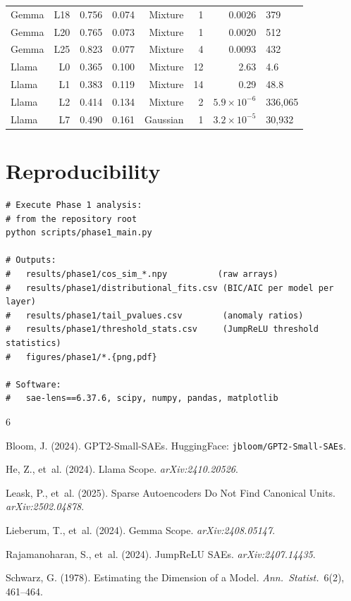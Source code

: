 \documentclass[11pt,a4paper]{article}
\begin{document}
\begin{longtable}{@{}lrrrrrrl@{}}
Gemma & L18 & 0.756 & 0.074 & Mixture & 1 & 0.0026   & 379 \\
Gemma & L20 & 0.765 & 0.073 & Mixture & 1 & 0.0020   & 512 \\
Gemma & L25 & 0.823 & 0.077 & Mixture & 4 & 0.0093   & 432 \\
Llama & L0  & 0.365 & 0.100 & Mixture & 12 & 2.63 & 4.6 \\
Llama & L1  & 0.383 & 0.119 & Mixture & 14 & 0.29 & 48.8 \\
Llama & L2  & 0.414 & 0.134 & Mixture & 2  & $5.9\times10^{-6}$ & 336,065 \\
Llama & L7  & 0.490 & 0.161 & Gaussian & 1 & $3.2\times10^{-5}$ & 30,932 \\
\end{longtable}

\section{Reproducibility}
\label{app:repro}

\begin{verbatim}
# Execute Phase 1 analysis:
# from the repository root
python scripts/phase1_main.py

# Outputs:
#   results/phase1/cos_sim_*.npy          (raw arrays)
#   results/phase1/distributional_fits.csv (BIC/AIC per model per layer)
#   results/phase1/tail_pvalues.csv        (anomaly ratios)
#   results/phase1/threshold_stats.csv     (JumpReLU threshold statistics)
#   figures/phase1/*.{png,pdf}

# Software:
#   sae-lens==6.37.6, scipy, numpy, pandas, matplotlib
\end{verbatim}

\newpage

\begin{thebibliography}{6}

Bloom, J. (2024). GPT2-Small-SAEs. HuggingFace: \texttt{jbloom/GPT2-Small-SAEs}.

He, Z., et~al. (2024). Llama Scope. \emph{arXiv:2410.20526}.

Leask, P., et~al. (2025). Sparse Autoencoders Do Not Find Canonical Units. \emph{arXiv:2502.04878}.

Lieberum, T., et~al. (2024). Gemma Scope. \emph{arXiv:2408.05147}.

Rajamanoharan, S., et~al. (2024). JumpReLU SAEs. \emph{arXiv:2407.14435}.

Schwarz, G. (1978). Estimating the Dimension of a Model. \emph{Ann.\ Statist.}\ 6(2), 461--464.

\end{thebibliography}
\end{document}
